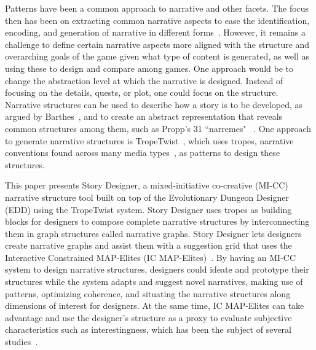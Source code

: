 Patterns have been a common approach to narrative and other facets. The focus then has been on extracting common narrative aspects to ease the identification, encoding, and generation of narrative in different forms~\cite{p11doran_prototype_2011,alvarez_tropetwist_2022,trenton_quest_2010,treanor_ai-based_2015,rouse_sketching_2018,breault_let_2021}. However, it remains a challenge to define certain narrative aspects more aligned with the structure and overarching goals of the game given what type of content is generated, as well as using these to design and compare among games. One approach would be to change the abstraction level at which the narrative is designed. Instead of focusing on the details, quests, or plot, one could focus on the structure. Narrative structures can be used to describe how a story is to be developed, as argued by Barthes~\cite{p11barthes_introduction_1966}, and to create an abstract representation that reveals common structures among them, such as Propp's 31 ``narremes" ~\cite{p11propp_morphology_1975}. One approach to generate narrative structures is TropeTwist~\cite{p11alvarez_tropetwist_2022}, which uses tropes, narrative conventions found across many media types~\cite{p11lewis_governing_2018,garcia-sanchez_simpsons_2021}, as patterns to design these structures.

This paper presents Story Designer, a mixed-initiative co-creative (MI-CC) narrative structure tool built on top of the Evolutionary Dungeon Designer (EDD) using the TropeTwist system. Story Designer uses tropes as building blocks for designers to compose complete narrative structures by interconnecting them in graph structures called narrative graphs. Story Designer lets designers create narrative graphs and assist them with a suggestion grid that uses the Interactive Constrained MAP-Elites (IC MAP-Elites)~\cite{p11alvarez_interactive_2020}. By having an MI-CC system to design narrative structures, designers could ideate and prototype their structures while the system adapts and suggest novel narratives, making use of patterns, optimizing coherence, and situating the narrative structures along dimensions of interest for designers. At the same time, IC MAP-Elites can take advantage and use the designer's structure as a proxy to evaluate subjective characteristics such as interestingness, which has been the subject of several studies~\cite{p11perez_model_2013,lankoski_models_2013,rowe_storyeval_2009}.


